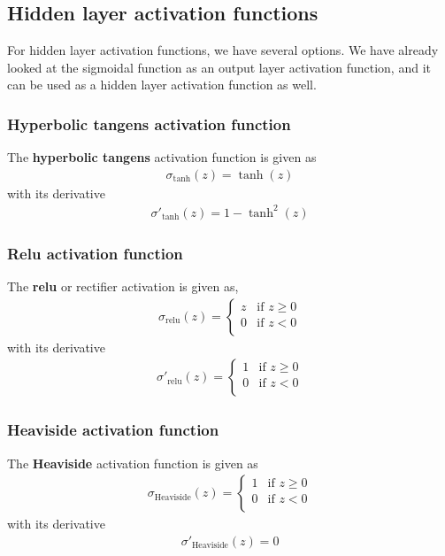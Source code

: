 \documentclass[a4paper,10pt]{article}
\begin{document}
\subsection{Hidden layer activation functions}
For hidden layer activation functions, we have several options. We have already looked at the sigmoidal function as an output layer activation function, and it can be used as a hidden layer activation function as well.

\subsubsection{Hyperbolic tangens activation function}
The \textbf{hyperbolic tangens} activation function is given as
\begin{align}
    \sigma_\mathrm{tanh}(z) = \tanh(z)
    \label{eq:act-tanh}
\end{align}
with its derivative
\begin{align}
    \sigma'_\mathrm{tanh}(z) = 1 - \tanh^2(z)
    \label{eq:act-tanh-der}
\end{align}

\subsubsection{Relu activation function}
The \textbf{relu} or rectifier activation is given as,
\begin{align}
    \sigma_\mathrm{relu}(z) = 
    \begin{cases}
        z & \text{if } z \geq 0 \\
        0 & \text{if } z < 0 \\
    \end{cases}
    \label{eq:act-relu}
\end{align}
with its derivative
\begin{align}
    \sigma'_\mathrm{relu}(z) = 
    \begin{cases}
        1 & \text{if } z \geq 0 \\
        0 & \text{if } z < 0 \\
    \end{cases}
    \label{eq:act-relu-der}
\end{align}

\subsubsection{Heaviside activation function}
The \textbf{Heaviside} activation function is given as
\begin{align}
    \sigma_\mathrm{Heaviside}(z) = 
    \begin{cases}
        1 & \text{if } z \geq 0 \\
        0 & \text{if } z < 0 \\
    \end{cases}
    \label{eq:act-heaviside}
\end{align}
with its derivative
\begin{align}
    \sigma'_\mathrm{Heaviside}(z) = 0
    \label{eq:act-heaviside-der}
\end{align}
\end{document}
